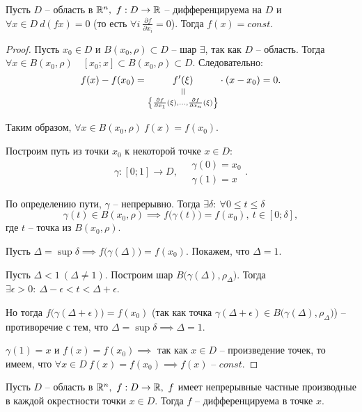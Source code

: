 \begin{corollary}
    Пусть $ D $ -- область в $ \mathbb{R}^n, \ f:D \rightarrow \mathbb{R} $ -- дифференцируема на $ D $ и $ \forall x \in D \ d(fx) = 0 $ (то есть $ \forall i \ \frac{\partial f}{\partial x_i} = 0 $). Тогда $ f(x) = const $.
\end{corollary}

\begin{proof}
    Пусть $ x_0 \in D $ и $ B(x_0,\rho)\subset D $ -- шар $ \exists $, так как $ D $ -- область. Тогда $ \forall x \in B(x_0,\rho) \quad [x_0;x]\subset B(x_0,\rho)\subset D $. Следовательно:
    \[
        f(x) - f(x_0) = \equalto{f'(\xi)}{\left\{\frac{\partial f}{\partial x_1}(\xi),\ldots,\frac{\partial f}{\partial x_n}(\xi)\right\}}\cdot (x-x_0) = 0.
    \]

    Таким образом, $ \forall x \in B(x_0,\rho) \ f(x) = f(x_0) $.

    Построим путь из точки $ x_0 $ к некоторой точке $ x \in D $:
    \[
        \gamma:[0;1]\rightarrow D, \quad \begin{array}{l}
            \gamma(0) = x_0 \\
            \gamma(1) = x
        \end{array}.
    \]

    По определению пути, $ \gamma $ -- непрерывно. Тогда $ \exists\delta: \ \forall 0 \leqslant t \leqslant\delta$
    \[
        \gamma(t) \in B(x_0,\rho) \implies f\big(\gamma(t)\big) = f(x_0), \ t \in [0;\delta],
    \] где $ t $ -- точка из $ B(x_0,\rho) $.

    Пусть $ \Delta = \sup\delta \implies f\big(\gamma(\Delta)\big) = f(x_0) $. Покажем, что $\Delta = 1$.

    Пусть $ \Delta < 1 \ (\Delta \ne 1) $. Построим шар $ B\big(\gamma(\Delta),\rho_\Delta\big) $. Тогда $ \exists \epsilon > 0: \ \Delta - \epsilon < t < \Delta + \epsilon $.

    Но тогда $ f\big(\gamma(\Delta + \epsilon)\big) = f(x_0) $ (так как точка $ \gamma(\Delta + \epsilon) \in B\big(\gamma(\Delta),\rho_\Delta\big) $) -- противоречие с тем, что $ \Delta = \sup\delta \implies \Delta = 1 $.

    $ \gamma(1) = x $ и $ f(x) = f(x_0) \implies $ так как $ x \in D $ -- произведение точек, то имеем, что $ \forall x \in D \ f(x) = f(x_0) \implies f(x)\text{ -- }const $.
\end{proof}

\begin{theorem}
    Пусть $ D $ -- область в $ \R^n, \ f:D \rightarrow\R, \ f $ имеет непрерывные частные производные в каждой окрестности точки $ x\in D $. Тогда $ f $ -- дифференцируема в точке $ x $.
\end{theorem}

